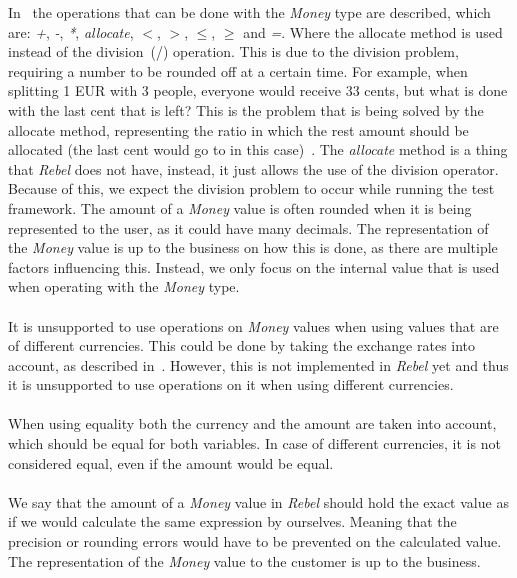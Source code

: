 In~\cite{fowler2002patterns} the operations that can be done with the
\textit{Money} type are described, which are: \textit{+}, \textit{-},
\textit{*}, \textit{allocate}, \textit{$<$}, \textit{$>$}, \textit{$\leq$},
\textit{$\geq$} and \textit{=}. Where the allocate method is used instead of the
division~(/) operation. This is due to the division problem, requiring a number
to be rounded off at a certain time. For example, when splitting 1 EUR with 3
people, everyone would receive 33 cents, but what is done with the last cent
that is left? This is the problem that is being solved by the allocate method,
representing the ratio in which the rest amount should be allocated (the last
cent would go to in this case)~\cite{fowler2002patterns}. The \textit{allocate}
method is a thing that \textit{Rebel} does not have, instead, it just allows the
use of the division operator. Because of this, we expect the division problem to
occur while running the test framework. The amount of a \textit{Money} value is
often rounded when it is being represented to the user, as it could have many
decimals. The representation of the \textit{Money} value is up to the business
on how this is done, as there are multiple factors influencing this. Instead, we
only focus on the internal value that is used when operating with the
\textit{Money} type.\\
\\
It is unsupported to use operations on \textit{Money} values when using values
that are of different currencies. This could be done by taking the exchange
rates into account, as described in~\cite{fowler2002patterns}. However, this is
not implemented in \textit{Rebel} yet and thus it is unsupported to use
operations on it when using different currencies.\\
\\
When using equality both the currency and the amount are taken into account,
which should be equal for both variables. In case of different currencies, it is
not considered equal, even if the amount would be equal.\\
\\
We say that the amount of a \textit{Money} value in \textit{Rebel} should hold
the exact value as if we would calculate the same expression by ourselves.
Meaning that the precision or rounding errors would have to be prevented on the
calculated value. The representation of the \textit{Money} value to the customer
is up to the business.

